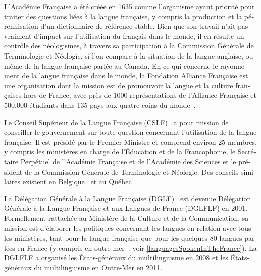 \begin{french}
\begin{multicols}{2}
L'Académie Française a été créée en 1635 comme l'organisme ayant
priorité pour traiter des questions liées à la langue française, y
compris la production et la pérennisation d'un dictionnaire de référence stable. Bien que son
travail n'ait pas vraiment d'impact sur l'utilisation du français dans
le monde, il en résulte un contrôle des néologismes, à travers sa
participation à la Commission Générale de Terminologie et Néologie, si
l'on compare à la situation de la langue anglaise, ou même de la
langue française parlée au Canada. En ce qui concerne le rayonnement de la langue française dans le monde,
la Fondation Alliance Française est une organisation dont la mission est de promouvoir la langue et la
culture françaises hors de France, avec près de 1000 représentations
de l'Alliance Française et 500.000 étudiants dans 135 pays aux quatre coins du monde~\cite{monde}.

Le Conseil Supérieur de la Langue Française (CSLF)~\cite{cslf} a pour mission de
conseiller le gouvernement sur toute question concernant l'utilisation
de la langue française. Il est présidé par le Premier Ministre et
comprend environ 25 membres, y compris les ministères en charge de
l'Éducation et de la Francophonie, le Secrétaire Perpétuel de
l'Académie Française et de l'Académie des Sciences et le président de
la Commission Générale de Terminologie et Néologie. Des conseils
similaires existent en Belgique~\cite{belgique} et au Québec~\cite{quebec}.

La Délégation Générale à la Langue Française (DGLF)~\cite{dglf} est
devenue Délégation Générale à la Langue Française et aux Langues de
France (DGLFLF) en 2001. Formellement rattachée au Ministère de la
Culture et de la Communication, sa mission est d'élaborer les
politiques concernant les langues en relation avec tous les
ministères, tant pour la langue française que pour les quelques 80
langues parlées en France (y compris en outre-mer~: voir
\ref{languagesSpokenInTheFrance}). La DGLFLF a organisé les
États-généraux du multilinguisme en 2008 et les États-généraux du
multilinguisme en Outre-Mer en 2011.


\end{multicols}
\end{french}
